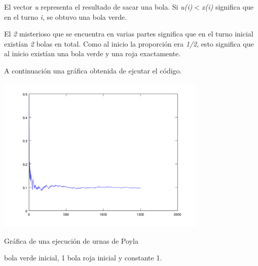 El vector \textsl{u} representa el resultado de sacar una bola. Si \textsl{u(i)$<$x(i)} significa que en el turno \textsl{i}, 
se obtuvo una bola verde.\par\null

El \textsl{2} misterioso que se encuentra en varias partes significa que en el turno inicial existían \textsl{2} bolas en total.
Como al inicio la proporción era \textsl{1/2}, esto significa que al inicio existían una bola verde y una roja exactamente.\par\null

A continuación una gráfica obtenida de ejcutar el código.

\begin{center}
    \includegraphics[width=10cm]{tarea2/problema2_2/poyla.PNG}
\end{center}
\begin{center}
    Gráfica de una ejecución de urnas de Poyla \par{} bola verde inicial, 1 bola roja inicial y constante 1.
\end{center}\par\null